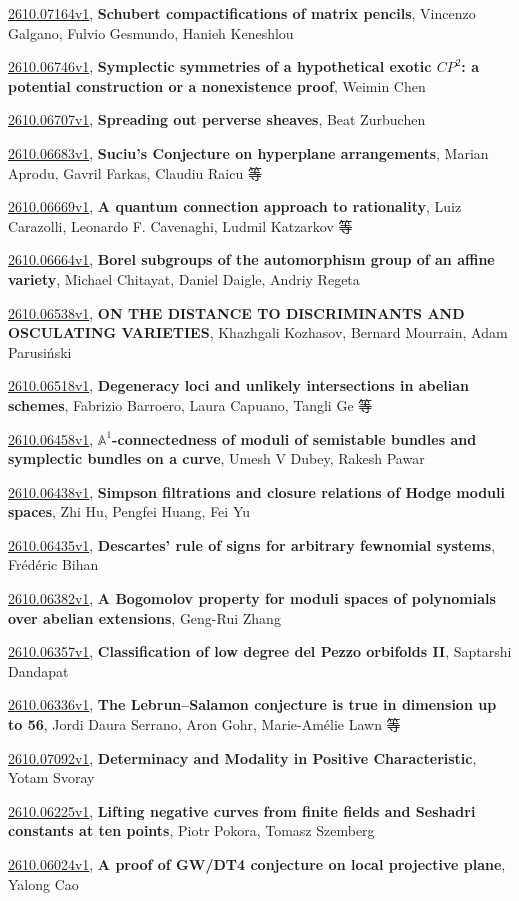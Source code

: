 \documentclass[9pt, a4paper]{article}
\theoremstyle{plain}
\theoremstyle{definition}
\theoremstyle{remark}
\newcommand{\arxiv}[3]{\href{https://arxiv.org/abs/#1}{#1}, \textbf{\textcolor{arxivblue}{#2}}, #3}
\begin{document}
\arxiv{2610.07164v1}{Schubert compactifications of matrix pencils}{Vincenzo Galgano, Fulvio Gesmundo, Hanieh Keneshlou}

\arxiv{2610.06746v1}{Symplectic symmetries of a hypothetical exotic $CP^2$: a potential construction or a nonexistence proof}{Weimin Chen}

\arxiv{2610.06707v1}{Spreading out perverse sheaves}{Beat Zurbuchen}

\arxiv{2610.06683v1}{Suciu's Conjecture on hyperplane arrangements}{Marian Aprodu, Gavril Farkas, Claudiu Raicu 等}

\arxiv{2610.06669v1}{A quantum connection approach to rationality}{Luiz Carazolli, Leonardo F. Cavenaghi, Ludmil Katzarkov 等}

\arxiv{2610.06664v1}{Borel subgroups of the automorphism group of an affine variety}{Michael Chitayat, Daniel Daigle, Andriy Regeta}

\arxiv{2610.06538v1}{ON THE DISTANCE TO DISCRIMINANTS AND OSCULATING VARIETIES}{Khazhgali Kozhasov, Bernard Mourrain, Adam Parusi{ń}ski}

\arxiv{2610.06518v1}{Degeneracy loci and unlikely intersections in abelian schemes}{Fabrizio Barroero, Laura Capuano, Tangli Ge 等}

\arxiv{2610.06458v1}{$\mathbb{A}^1$-connectedness of moduli of semistable bundles and symplectic bundles on a curve}{Umesh V Dubey, Rakesh Pawar}

\arxiv{2610.06438v1}{Simpson filtrations and closure relations of Hodge moduli spaces}{Zhi Hu, Pengfei Huang, Fei Yu}

\arxiv{2610.06435v1}{Descartes' rule of signs for arbitrary fewnomial systems}{Frédéric Bihan}

\arxiv{2610.06382v1}{A Bogomolov property for moduli spaces of polynomials over abelian extensions}{Geng-Rui Zhang}

\arxiv{2610.06357v1}{Classification of low degree del Pezzo orbifolds II}{Saptarshi Dandapat}

\arxiv{2610.06336v1}{The Lebrun--Salamon conjecture is true in dimension up to 56}{Jordi Daura Serrano, Aron Gohr, Marie-Amélie Lawn 等}

\arxiv{2610.07092v1}{Determinacy and Modality in Positive Characteristic}{Yotam Svoray}

\arxiv{2610.06225v1}{Lifting negative curves from finite fields and Seshadri constants at ten points}{Piotr Pokora, Tomasz Szemberg}

\arxiv{2610.06024v1}{A proof of GW/DT4 conjecture on local projective plane}{Yalong Cao}
\end{document}
